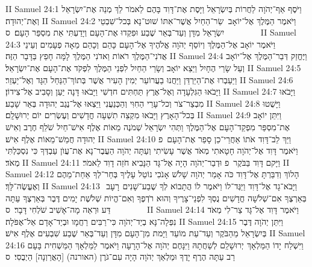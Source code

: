 II Samuel 24:1	וַיֹּסֶף אַף־יְהֹוָה לַחֲרוֹת בְּיִשְׂרָאֵל וַיָּסֶת אֶת־דָּוִד בָּהֶם לֵאמֹר לֵךְ מְנֵה אֶת־יִשְׂרָאֵל וְאֶת־יְהוּדָה׃
II Samuel 24:2	וַיֹּאמֶר הַמֶּלֶךְ אֶל־יוֹאָב  שַׂר־הַחַיִל אֲשֶׁר־אִתּוֹ שׁוּט־נָא בְּכל־שִׁבְטֵי יִשְׂרָאֵל מִדָּן וְעַד־בְּאֵר שֶׁבַע וּפִקְדוּ אֶת־הָעָם וְיָדַעְתִּי אֵת מִסְפַּר הָעָם׃ {ס}        
II Samuel 24:3	וַיֹּאמֶר יוֹאָב אֶל־הַמֶּלֶךְ וְיוֹסֵף יְהֹוָה אֱלֹהֶיךָ אֶל־הָעָם כָּהֵם  וְכָהֵם מֵאָה פְעָמִים וְעֵינֵי אֲדֹנִי־הַמֶּלֶךְ רֹאוֹת וַאדֹנִי הַמֶּלֶךְ לָמָּה חָפֵץ בַּדָּבָר הַזֶּה׃
II Samuel 24:4	וַיֶּחֱזַק דְּבַר־הַמֶּלֶךְ אֶל־יוֹאָב וְעַל שָׂרֵי הֶחָיִל וַיֵּצֵא יוֹאָב וְשָׂרֵי הַחַיִל לִפְנֵי הַמֶּלֶךְ לִפְקֹד אֶת־הָעָם אֶת־יִשְׂרָאֵל׃
II Samuel 24:5	וַיַּעַבְרוּ אֶת־הַיַּרְדֵּן וַיַּחֲנוּ בַעֲרוֹעֵר יְמִין הָעִיר אֲשֶׁר בְּתוֹךְ־הַנַּחַל הַגָּד וְאֶל־יַעְזֵר׃
II Samuel 24:6	וַיָּבֹאוּ הַגִּלְעָדָה וְאֶל־אֶרֶץ תַּחְתִּים חדְשִׁי וַיָּבֹאוּ דָּנָה יַּעַן וְסָבִיב אֶל־צִידוֹן׃
II Samuel 24:7	וַיָּבֹאוּ מִבְצַר־צֹר וְכל־עָרֵי הַחִוִּי וְהַכְּנַעֲנִי וַיֵּצְאוּ אֶל־נֶגֶב יְהוּדָה בְּאֵר שָׁבַע׃
II Samuel 24:8	וַיָּשֻׁטוּ בְּכל־הָאָרֶץ וַיָּבֹאוּ מִקְצֵה תִשְׁעָה חֳדָשִׁים וְעֶשְׂרִים יוֹם יְרוּשָׁלָ͏ִם׃
II Samuel 24:9	וַיִּתֵּן יוֹאָב אֶת־מִסְפַּר מִפְקַד־הָעָם אֶל־הַמֶּלֶךְ וַתְּהִי יִשְׂרָאֵל שְׁמֹנֶה מֵאוֹת אֶלֶף אִישׁ־חַיִל שֹׁלֵף חֶרֶב וְאִישׁ יְהוּדָה חֲמֵשׁ־מֵאוֹת אֶלֶף אִישׁ׃
II Samuel 24:10	וַיַּךְ לֵב־דָּוִד אֹתוֹ אַחֲרֵי־כֵן סָפַר אֶת־הָעָם {פ} וַיֹּאמֶר דָּוִד אֶל־יְהֹוָה חָטָאתִי מְאֹד אֲשֶׁר עָשִׂיתִי וְעַתָּה יְהֹוָה הַעֲבֶר־נָא אֶת־עֲוֺן עַבְדְּךָ כִּי נִסְכַּלְתִּי מְאֹד׃
II Samuel 24:11	וַיָּקם דָּוִד בַּבֹּקֶר {פ} וּדְבַר־יְהֹוָה הָיָה אֶל־גָּד הַנָּבִיא חֹזֵה דָוִד לֵאמֹר׃
II Samuel 24:12	הָלוֹךְ וְדִבַּרְתָּ אֶל־דָּוִד כֹּה אָמַר יְהֹוָה שָׁלֹשׁ אָנֹכִי נוֹטֵל עָלֶיךָ בְּחַר־לְךָ אַחַת־מֵהֶם וְאֶעֱשֶׂה־לָּךְ׃
II Samuel 24:13	וַיָּבֹא־גָד אֶל־דָּוִד וַיַּגֶּד־לוֹ וַיֹּאמֶר לוֹ הֲתָבוֹא לְךָ שֶׁבַע־שָׁנִים  רָעָב  בְּאַרְצֶךָ אִם־שְׁלֹשָׁה חֳדָשִׁים נֻסְךָ לִפְנֵי־צָרֶיךָ וְהוּא רֹדְפֶךָ וְאִם־הֱיוֹת שְׁלֹשֶׁת יָמִים דֶּבֶר בְּאַרְצֶךָ עַתָּה דַּע וּרְאֵה מָה־אָשִׁיב שֹׁלְחִי דָּבָר׃ {ס}        
II Samuel 24:14	וַיֹּאמֶר דָּוִד אֶל־גָּד צַר־לִי מְאֹד נִפְּלָה־נָּא בְיַד־יְהֹוָה כִּי־רַבִּים רַחֲמָו וּבְיַד־אָדָם אַל־אֶפֹּלָה׃
II Samuel 24:15	וַיִּתֵּן יְהֹוָה דֶּבֶר בְּיִשְׂרָאֵל מֵהַבֹּקֶר וְעַד־עֵת מוֹעֵד וַיָּמת מִן־הָעָם מִדָּן וְעַד־בְּאֵר שֶׁבַע שִׁבְעִים אֶלֶף אִישׁ׃
II Samuel 24:16	וַיִּשְׁלַח יָדוֹ הַמַּלְאָךְ  יְרוּשָׁלַ͏ִם לְשַׁחֲתָהּ וַיִּנָּחֶם יְהֹוָה אֶל־הָרָעָה וַיֹּאמֶר לַמַּלְאָךְ הַמַּשְׁחִית בָּעָם רַב עַתָּה הֶרֶף יָדֶךָ וּמַלְאַךְ יְהֹוָה הָיָה עִם־גֹּרֶן (האורנה) [הָאֲרַוְנָה] הַיְבֻסִי׃ {ס}        

